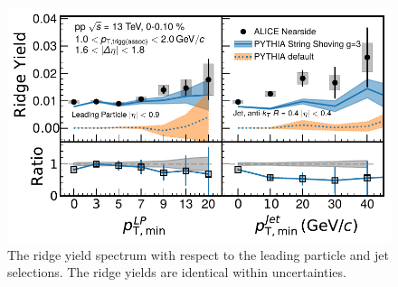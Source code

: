 \begin{figure}[h!]
	\centering
	\includegraphics[width=0.99\linewidth]{./figures/Fig6_RidgeYieldESE.pdf}
	\caption{The ridge yield spectrum with respect to the leading particle and jet selections. The ridge yields are identical within uncertainties.}
	\label{fig:RidgeYield_ESE}
\end{figure}




